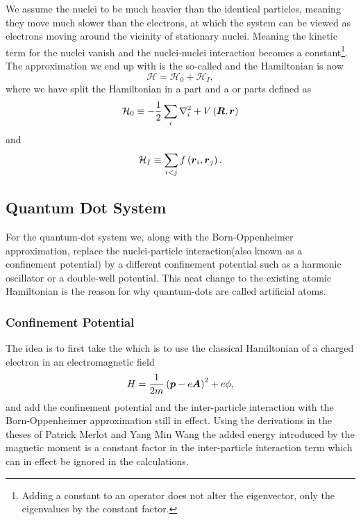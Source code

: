     We assume the nuclei to be much heavier than the identical particles,
    meaning they move much slower than the electrons, at which the system can
    be viewed as electrons moving around the vicinity of stationary nuclei.
    Meaning the kinetic term for the nuclei vanish and the nuclei-nuclei
    interaction becomes a constant\footnote{Adding a constant to an operator
    does not alter the eigenvector, only the eigenvalues by the constant
    factor\cite{linalgDavid}.}. The approximation we end up with is the
    so-called  and the Hamiltonian is now
        \begin{equation}
            \mathcal{H} = \mathcal{H}_0 + \mathcal{H}_I,
        \end{equation}
    where we have split the Hamiltonian in a  part and a
     or  parts defined as
        \begin{equation}
            \mathcal{H}_0 \equiv - \frac{1}{2} \sum\limits_i \nabla^2_i +
            V\left(\boldsymbol{{R}},\boldsymbol{{r}}\right)
        \end{equation}
    and
        \begin{equation}
            \mathcal{H}_I \equiv \sum_{i<j} f\left(\boldsymbol{{r}}_i,
            \boldsymbol{{r}}_j\right).
        \end{equation}

\subsection{Quantum Dot System}
    For the quantum-dot system we, along with the Born-Oppenheimer
    approximation, replace the nuclei-particle interaction(also known as a
    confinement potential) by a different confinement potential such as a
    harmonic oscillator or a double-well potential. This neat change to the
    existing atomic Hamiltonian is the reason for why quantum-dots are called
    artificial atoms. 

\subsubsection{Confinement Potential}
    The idea is to first take the  which is to use the
    classical Hamiltonian of a charged electron in an electromagnetic
    field \cite{claselcwiley}
        \begin{equation}
            H = \frac{1}{2m}\left(\boldsymbol{{p}} - e\boldsymbol{{A}}\right)^2 + e\phi,
        \end{equation}
    and add the confinement potential and the inter-particle interaction with
    the Born-Oppenheimer approximation still in effect. Using the derivations
    in the theses of Patrick Merlot \cite{merlotthesis} and Yang Min
    Wang \cite{yangthesis} the added energy introduced by the magnetic moment is
    a constant factor in the inter-particle interaction term which can in
    effect be ignored in the calculations. 
    
